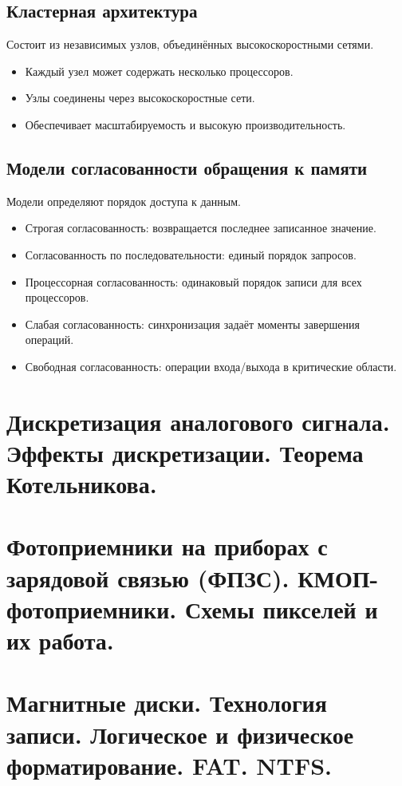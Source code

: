 	\subsection{Кластерная архитектура}
	Состоит из независимых узлов, объединённых высокоскоростными сетями.
	\begin{itemize}
		\item Каждый узел может содержать несколько процессоров.
		\item Узлы соединены через высокоскоростные сети.
		\item Обеспечивает масштабируемость и высокую производительность.
	\end{itemize}
	
	\subsection{Модели согласованности обращения к памяти}
	Модели определяют порядок доступа к данным.
	\begin{itemize}
		\item Строгая согласованность: возвращается последнее записанное значение.
		\item Согласованность по последовательности: единый порядок запросов.
		\item Процессорная согласованность: одинаковый порядок записи для всех процессоров.
		\item Слабая согласованность: синхронизация задаёт моменты завершения операций.
		\item Свободная согласованность: операции входа/выхода в критические области.
	\end{itemize}
	
	\newpage
	
	\section{Дискретизация аналогового сигнала. Эффекты дискретизации. Теорема Котельникова.}
	
	\section{Фотоприемники на приборах с зарядовой связью (ФПЗС). КМОП-фотоприемники. Схемы пикселей и их работа.}
	
	\section{Магнитные диски.  Технология записи.  Логическое и физическое форматирование. FAT. NTFS.}
	
